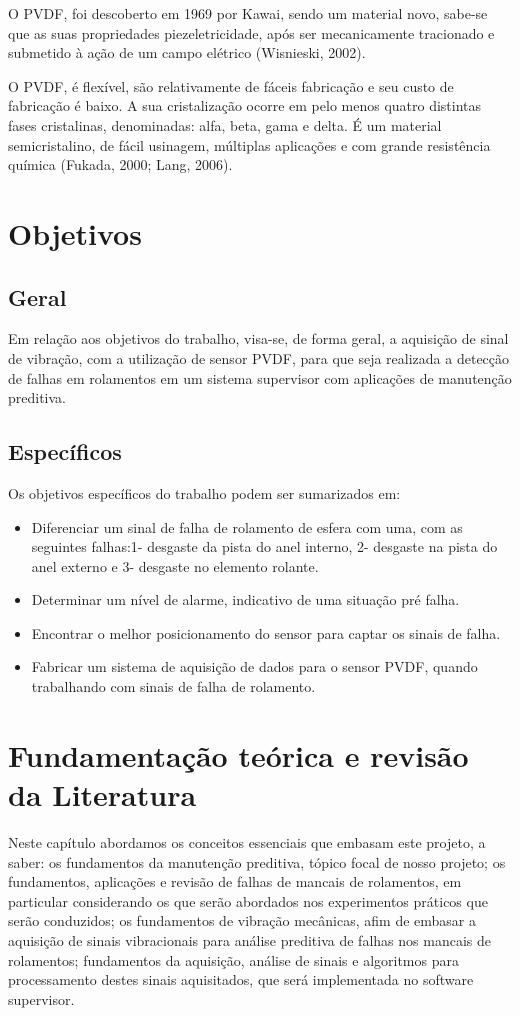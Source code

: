 \documentclass[
	12pt,				
	oneside,			
	a4paper,			
	english,			
	brazil				
	]{abntex2ppgsi}
\begin{document}
O PVDF, foi descoberto em 1969 por Kawai, sendo um material novo, sabe-se que as suas propriedades piezeletricidade, após ser mecanicamente tracionado e submetido à ação de um campo elétrico (Wisnieski, 2002).

O PVDF, é flexível, são relativamente de fáceis fabricação e seu custo de fabricação é baixo.  A sua cristalização ocorre em pelo menos quatro distintas fases  cristalinas, denominadas: alfa, beta, gama e delta. É um material semicristalino, de fácil usinagem, múltiplas aplicações e com grande resistência química (Fukada, 2000; Lang, 2006).

\chapter{Objetivos}

\section{\textbf {Geral}}

Em relação aos objetivos do trabalho, visa-se, de forma geral, a aquisição de sinal de vibração, com a utilização de sensor PVDF, para que seja realizada a detecção de falhas em rolamentos em um sistema supervisor com aplicações de manutenção preditiva.

\section{\textbf {Específicos}}

Os objetivos específicos do trabalho podem ser sumarizados em:

\begin{itemize}
	\item Diferenciar um sinal de falha de rolamento de esfera com uma, com as seguintes falhas:1- desgaste da pista do anel interno, 2- desgaste na pista do anel externo e 3- desgaste no elemento rolante.
	\item Determinar um nível de alarme, indicativo de uma situação pré falha.
	\item Encontrar o melhor posicionamento do sensor para captar os sinais de falha.\
	\item Fabricar um sistema de aquisição de dados para o sensor PVDF, quando trabalhando com sinais de falha de rolamento.
\end{itemize}

\chapter{Fundamentação teórica e revisão da Literatura}
Neste capítulo abordamos os conceitos essenciais que embasam este projeto, a saber: os fundamentos da manutenção preditiva, tópico focal de nosso projeto; os fundamentos, aplicações e revisão de falhas de mancais de rolamentos, em particular considerando os que serão abordados nos experimentos práticos que serão conduzidos; os fundamentos de vibração mecânicas, afim de embasar a aquisição de sinais vibracionais para análise preditiva de falhas nos mancais de rolamentos; fundamentos da aquisição, análise de sinais e algoritmos para processamento destes sinais aquisitados, que será implementada no software supervisor.
\end{document}
